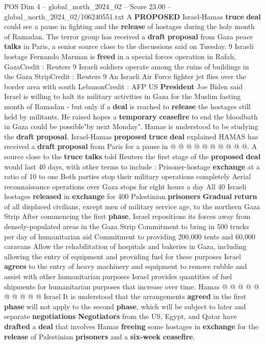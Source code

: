 \begin{textsample}{POS Dim 4 – global\_north\_2024\_02 – Score 23.00 – global\_north\_2024\_02/106240551.txt}  \label{ex:f4_pos_178}
A \textbf{PROPOSED} Israel-Hamas \textbf{truce} \textbf{deal} could see a pause in fighting and the \textbf{release} of hostages during the holy month of Ramadan.
The terror group has received a \textbf{draft} \textbf{proposal} from Gaza peace \textbf{talks} in Paris, a senior source close to the discussions said on Tuesday. 9 Israeli hostage Fernando Marman is \textbf{freed} in a special forces operation in Rafah, GazaCredit : Reuters 9 Israeli soldiers operate among the ruins of buildings in the Gaza StripCredit : Reuters 9 An Israeli Air Force fighter jet flies over the border area with south LebanonCredit : AFP US \textbf{President} Joe Biden said Israel is willing to halt its military activities in Gaza for the Muslim fasting month of Ramadan - but only if a \textbf{deal} is reached to \textbf{release} the hostages still held by militants.
He raised hopes a \textbf{temporary} \textbf{ceasefire} to end the bloodbath in Gaza could be possible"by next Monday".
Hamas is understood to be studying the \textbf{draft} \textbf{proposal}.
Israel-Hamas \textbf{proposed} \textbf{truce} \textbf{deal} explained HAMAS has received a \textbf{draft} \textbf{proposal} from Paris for a pause in @ @ @ @ @ @ @ @ @ @.
A source close to the \textbf{truce} \textbf{talks} told Reuters the first stage of the \textbf{proposed} \textbf{deal} would last 40 days, with other terms to include : Prisoner-hostage \textbf{exchange} at a ratio of 10 to one Both parties stop their military operations completely Aerial reconnaissance operations over Gaza stops for eight hours a day All 40 Israeli hostages \textbf{released} in \textbf{exchange} for 400 Palestinian \textbf{prisoners} \textbf{Gradual} \textbf{return} of all displaced civilians, except men of military service age, to the northern Gaza Strip After commencing the first \textbf{phase}, Israel repositions its forces away from densely-populated areas in the Gaza Strip Commitment to bring in 500 trucks per day of humanitarian aid Commitment to providing 200,000 tents and 60,000 caravans Allow the rehabilitation of hospitals and bakeries in Gaza, including allowing the entry of equipment and providing fuel for these purposes Israel \textbf{agrees} to the entry of heavy machinery and equipment to remove rubble and assist with other humanitarian purposes Israel provides quantities of fuel shipments for humanitarian purposes that increase over time.
Hamas @ @ @ @ @ @ @ @ @ @ Israel It is understood that the arrangements \textbf{agreed} in the first \textbf{phase} will not apply to the second \textbf{phase}, which will be subject to later and separate \textbf{negotiations} \textbf{Negotiators} from the US, Egypt, and Qatar have \textbf{drafted} a \textbf{deal} that involves Hamas \textbf{freeing} some hostages in \textbf{exchange} for the \textbf{release} of Palestinian \textbf{prisoners} and a \textbf{six-week} \textbf{ceasefire}.

\end{textsample}
